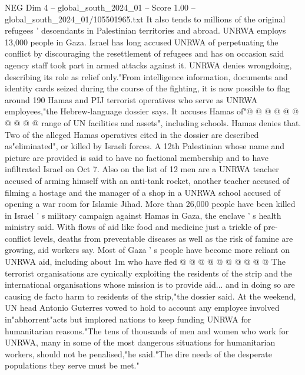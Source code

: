 \begin{textsample}{NEG Dim 4 – global\_south\_2024\_01 – Score 1.00 – global\_south\_2024\_01/105501965.txt}
It also tends to millions of the original refugees ' descendants in Palestinian territories and abroad.
UNRWA employs 13,000 people in Gaza.
Israel has long accused UNRWA of perpetuating the conflict by discouraging the resettlement of refugees and has on occasion said agency staff took part in armed attacks against it.
UNRWA denies wrongdoing, describing its role as relief only."From intelligence information, documents and identity cards seized during the course of the fighting, it is now possible to flag around 190 Hamas and PIJ terrorist operatives who serve as UNRWA employees,"the Hebrew-language dossier says.
It accuses Hamas of"@ @ @ @ @ @ @ @ @ @ range of UN facilities and assets", including schools.
Hamas denies that.
Two of the alleged Hamas operatives cited in the dossier are described as"eliminated", or killed by Israeli forces.
A 12th Palestinian whose name and picture are provided is said to have no factional membership and to have infiltrated Israel on Oct 7.
Also on the list of 12 men are a UNRWA teacher accused of arming himself with an anti-tank rocket, another teacher accused of filming a hostage and the manager of a shop in a UNRWA school accused of opening a war room for Islamic Jihad.
More than 26,000 people have been killed in Israel ' s military campaign against Hamas in Gaza, the enclave ' s health ministry said.
With flows of aid like food and medicine just a trickle of pre-conflict levels, deaths from preventable diseases as well as the risk of famine are growing, aid workers say.
Most of Gaza ' s people have become more reliant on UNRWA aid, including about 1m who have fled @ @ @ @ @ @ @ @ @ @ The terrorist organisations are cynically exploiting the residents of the strip and the international organisations whose mission is to provide aid... and in doing so are causing de facto harm to residents of the strip,"the dossier said.
At the weekend, UN head Antonio Guterres vowed to hold to account any employee involved in"abhorrent"acts but implored nations to keep funding UNRWA for humanitarian reasons."The tens of thousands of men and women who work for UNRWA, many in some of the most dangerous situations for humanitarian workers, should not be penalised,"he said."The dire needs of the desperate populations they serve must be met."

\end{textsample}
